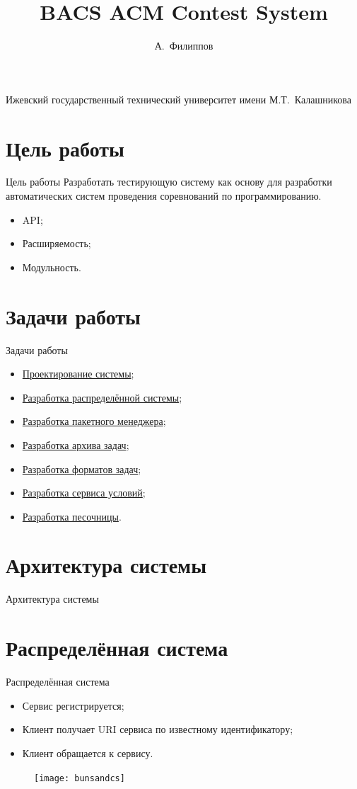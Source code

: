 \documentclass[xetex,mathserif,serif,10pt]{beamer}
\newenvironment{sframe}[2]{\section{#1}\begin{frame}[label=#2]{#1}}{\end{frame}}
\begin{document}
    \title[BACS]{BACS ACM Contest System}
    \author[Филиппов]{А.~Филиппов}
    \institute
    {
        Ижевский государственный технический университет имени М.Т.~Калашникова
    }

    

    \begin{sframe}{Цель работы}{target}
        Разработать тестирующую систему как основу для разработки
        автоматических систем проведения соревнований по программированию.

        \begin{itemize}
            \item API;
            \item Расширяемость;
            \item Модульность.
        \end{itemize}
    \end{sframe}

    \begin{sframe}{Задачи работы}{problems}
        \begin{itemize}
            \item \hyperlink{systemdesign}{Проектирование системы};
            \item \hyperlink{dcs}{Разработка распределённой системы};
            \item \hyperlink{bunsanpm}{Разработка пакетного менеджера};
            \item \hyperlink{bacsarchive}{Разработка архива задач};
            \item \hyperlink{bacsproblem}{Разработка форматов задач};
            \item \hyperlink{bacsstatementprovider}{Разработка сервиса условий};
            \item \hyperlink{sandbox}{Разработка песочницы}.
        \end{itemize}
    \end{sframe}

    \begin{sframe}{Архитектура системы}{systemdesign}
        \begin{figure}
            \resizebox{\columnwidth}{!}{
                
            }
        \end{figure}
    \end{sframe}

    \begin{sframe}{Распределённая система}{dcs}
        \begin{itemize}
            \item Сервис регистрируется;
            \item Клиент получает URI сервиса по известному идентификатору;
            \item Клиент обращается к сервису.
        \end{itemize}
        \begin{figure}
            \centering
            \texttt{[image: bunsandcs]}
        \end{figure}
    \end{sframe}
\end{document}
